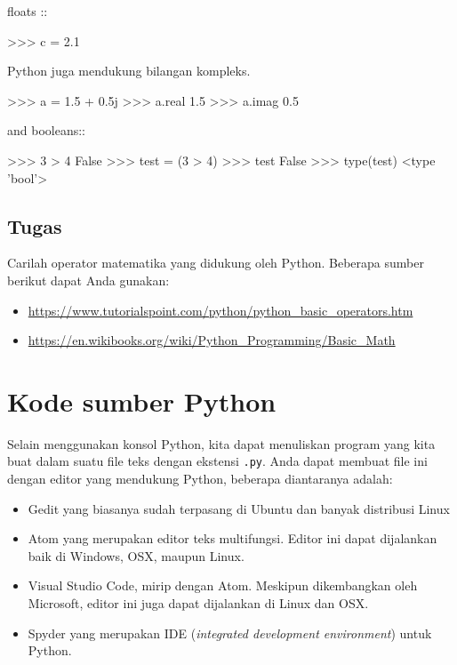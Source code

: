 \documentclass[a4paper,11pt]{extarticle}
\begin{document}
floats ::
\begin{pyconcode}
>>> c = 2.1
\end{pyconcode}

Python juga mendukung bilangan kompleks.
\begin{pyconcode}
>>> a = 1.5 + 0.5j
>>> a.real
1.5
>>> a.imag
0.5
\end{pyconcode}

and booleans::
\begin{pyconcode}
>>> 3 > 4
False
>>> test = (3 > 4)
>>> test
False
>>> type(test)
<type 'bool'>
\end{pyconcode}


\subsection*{Tugas}

Carilah operator matematika yang didukung oleh Python.
Beberapa sumber berikut dapat Anda gunakan:
\begin{itemize}
\item \url{https://www.tutorialspoint.com/python/python_basic_operators.htm}
\item \url{https://en.wikibooks.org/wiki/Python_Programming/Basic_Math}
\end{itemize}


\section{Kode sumber Python}

Selain menggunakan konsol Python, kita dapat menuliskan program
yang kita buat dalam suatu file teks dengan ekstensi \texttt{.py}.
Anda dapat membuat file ini dengan editor yang mendukung Python, beberapa
diantaranya adalah:
\begin{itemize}
\item \textsf{Gedit} yang biasanya sudah terpasang di Ubuntu dan banyak distribusi
Linux
\item \textsf{Atom} yang merupakan editor teks multifungsi. Editor ini dapat
dijalankan baik di Windows, OSX, maupun Linux.
\item \textsf{Visual Studio Code}, mirip dengan \textsf{Atom}.
Meskipun dikembangkan oleh Microsoft, editor ini juga dapat dijalankan di Linux dan
OSX.
\item \textsf{Spyder} yang merupakan IDE (\textit{integrated development environment}) untuk
Python.
\end{itemize}
\end{document}
